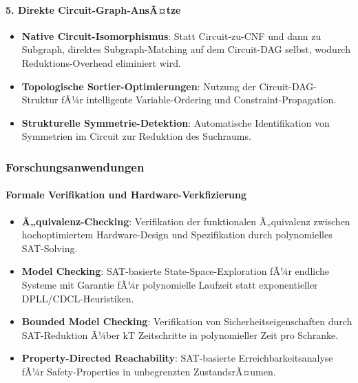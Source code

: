 ﻿\documentclass[a4paper,12pt]{article}
\theoremstyle{definition}
\begin{document}
\paragraph{5. Direkte Circuit-Graph-AnsÃ¤tze}

\begin{itemize}
	\item \textbf{Native Circuit-Isomorphismus}: Statt Circuit-zu-CNF und dann zu Subgraph, direktes Subgraph-Matching auf dem Circuit-DAG selbst, wodurch Reduktions-Overhead eliminiert wird.
	
	\item \textbf{Topologische Sortier-Optimierungen}: Nutzung der Circuit-DAG-Struktur fÃ¼r intelligente Variable-Ordering und Constraint-Propagation.
	
	\item \textbf{Strukturelle Symmetrie-Detektion}: Automatische Identifikation von Symmetrien im Circuit zur Reduktion des Suchraums.
\end{itemize}

\subsubsection{Forschungsanwendungen}

\paragraph{Formale Verifikation und Hardware-Verkfizierung}

\begin{itemize}
	\item \textbf{Ã„quivalenz-Checking}: Verifikation der funktionalen Ã„quivalenz zwischen hochoptimiertem Hardware-Design und Spezifikation durch polynomielles SAT-Solving.
	
	\item \textbf{Model Checking}: SAT-basierte State-Space-Exploration fÃ¼r endliche Systeme mit Garantie fÃ¼r polynomielle Laufzeit statt exponentieller DPLL/CDCL-Heuristiken.
	
	\item \textbf{Bounded Model Checking}: Verifikation von Sicherheitseigenschaften durch SAT-Reduktion Ã¼ber kT Zeitschritte in polynomieller Zeit pro Schranke.
	
	\item \textbf{Property-Directed Reachability}: SAT-basierte Erreichbarkeitsanalyse fÃ¼r Safety-Properties in unbegrenzten ZustandsrÃ¤umen.
\end{itemize}
\end{document}
